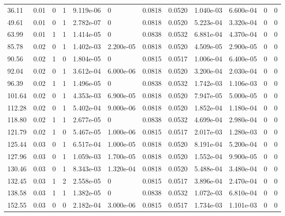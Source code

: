 \documentclass[preview]{standalone}
\begin{document}
{{\begin{tabular}{L{1.2cm}C{1.2cm} C{0.3cm}C{0.5cm} C{1.4cm}C{1.4cm} C{1.4cm}C{1.4cm} C{1.6cm}C{1.6cm} C{1.6cm}C{1.6cm}}
  36.11  &  0.01  & 0     &  1 &  9.119e-06  & 0  &  0.0818&   0.0520& 1.040e-03 & 6.600e-04   &  0 & 0  \\ 
  49.61  &  0.01  & 0     &  1 &  2.782e-07  & 0  &  0.0818&   0.0520& 5.223e-04 & 3.320e-04   &  0 & 0  \\ 
  63.99  &  0.01  & 1     &  1 &  1.414e-05  & 0  &  0.0838&   0.0532& 6.881e-04 & 4.370e-04   &  0 & 0  \\ 
  85.78  &  0.02  & 0     &  1 &  1.402e-03  & 2.200e-05  &  0.0818&   0.0520& 4.509e-05 & 2.900e-05   &  0 & 0  \\ 
  90.56  &  0.02  & 1     &  0 &  1.804e-05  & 0  &  0.0815&   0.0517& 1.006e-04 & 6.400e-05   &  0 & 0  \\ 
  92.04  &  0.02  & 0     &  1 &  3.612e-04  & 6.000e-06  &  0.0818&   0.0520& 3.200e-04 & 2.030e-04   &  0 & 0  \\ 
  96.39  &  0.02  & 1     &  1 &  1.496e-05  & 0  &  0.0838&   0.0532& 1.742e-03 & 1.106e-03   &  0 & 0  \\ 
  101.64  &  0.02  & 0     &  1 &  4.353e-03  & 6.900e-05  &  0.0818&   0.0520& 7.947e-05 & 5.000e-05   &  0 & 0  \\ 
  112.28  &  0.02  & 0     &  1 &  5.402e-04  & 9.000e-06  &  0.0818&   0.0520& 1.852e-04 & 1.180e-04   &  0 & 0  \\ 
  118.80  &  0.02  & 1     &  1 &  2.677e-05  & 0  &  0.0838&   0.0532& 4.699e-04 & 2.980e-04   &  0 & 0  \\ 
  121.79  &  0.02  & 1     &  0 &  5.467e-05  & 1.000e-06  &  0.0815&   0.0517& 2.017e-03 & 1.280e-03   &  0 & 0  \\ 
  125.44  &  0.03  & 0     &  1 &  6.517e-04  & 1.000e-05  &  0.0818&   0.0520& 8.191e-04 & 5.200e-04   &  0 & 0  \\ 
  127.96  &  0.03  & 0     &  1 &  1.059e-03  & 1.700e-05  &  0.0818&   0.0520& 1.552e-04 & 9.900e-05   &  0 & 0  \\ 
  130.46  &  0.03  & 0     &  1 &  8.343e-03  & 1.320e-04  &  0.0818&   0.0520& 5.488e-04 & 3.480e-04   &  0 & 0  \\ 
  132.45  &  0.03  & 1     &  2 &  2.558e-05  & 0  &  0.0815&   0.0517& 3.896e-04 & 2.470e-04   &  0 & 0  \\ 
  138.58  &  0.03  & 1     &  1 &  1.382e-05  & 0  &  0.0838&   0.0532& 1.072e-03 & 6.810e-04   &  0 & 0  \\ 
  152.55  &  0.03  & 0     &  0 &  2.182e-04  & 3.000e-06  &  0.0815&   0.0517& 1.734e-03 & 1.101e-03   &  0 & 0  \\ 

\end{tabular}}}
\end{document}
